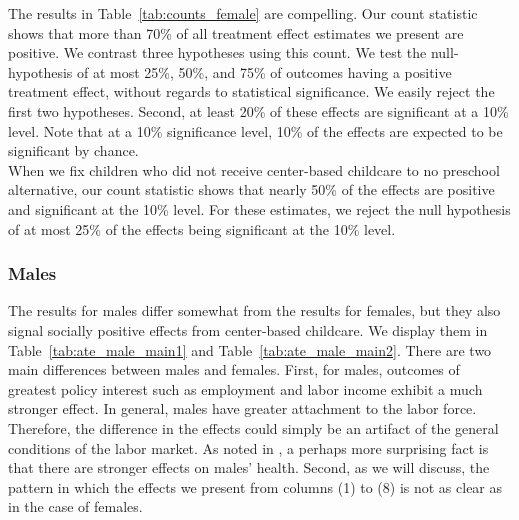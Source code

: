 \noindent The results in Table~\ref{tab:counts_female} are compelling. Our count statistic shows that more than 70\% of all treatment effect estimates we present are positive. We contrast three hypotheses using this count. We test the null-hypothesis of at most 25\%, 50\%, and 75\% of outcomes having a positive treatment effect, without regards to statistical significance. We easily reject the first two hypotheses. Second, at least 20\% of these effects are significant at a 10\% level. Note that at a 10\% significance level, 10\% of the effects are expected to be significant by chance.\\

\noindent When we fix children who did not receive center-based childcare to no preschool alternative, our count statistic shows that nearly 50\% of the effects are positive and significant at the 10\% level. For these estimates, we reject the null hypothesis of at most 25\% of the effects being significant at the 10\% level. \\





\subsubsection{Males} \label{section:centermales}

\noindent The results for males differ somewhat from the results for females, but they also signal socially positive effects from center-based childcare. We display them in Table~\ref{tab:ate_male_main1} and Table~\ref{tab:ate_male_main2}. There are two main differences between males and females. First, for males, outcomes of greatest policy interest such as employment and labor income exhibit a much stronger effect. In general, males have greater attachment to the labor force. Therefore, the difference in the effects could simply be an artifact of the general conditions of the labor market. As noted in \citet{Campbell_Conti_etal_2014_EarlyChildhoodInvestments}, a perhaps more surprising fact is that there are stronger effects on males' health. Second, as we will discuss, the pattern in which the effects we present from columns (1) to (8) is not as clear as in the case of females.\\

